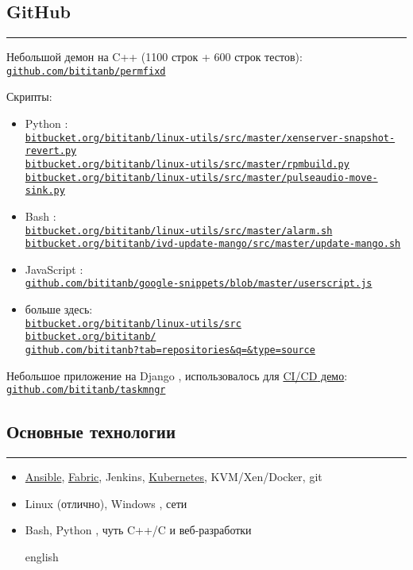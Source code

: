 \documentclass[11pt, a4paper]{article}
\newcommand{\Delimitline}{
  \vspace{-2ex}
  {\rule{\linewidth}{0.13ex}}
}
\newcommand\rurl[1]{%
  \href{http://#1}{\nolinkurl{#1}}%
}
\newcommand\Eng[1]{%
  \foreignlanguage{english}{#1}%
}
\begin{document}

\subsection*{{GitHub}}
\Delimitline

Небольшой демон на \Eng{C++} (1100 строк + 600 строк тестов):\\
  \rurl{github.com/bititanb/permfixd}
  
Скрипты:
\begin{itemize}
  \item \Eng{Python}:\\
    \rurl{bitbucket.org/bititanb/linux-utils/src/master/xenserver-snapshot-revert.py}\\
    \rurl{bitbucket.org/bititanb/linux-utils/src/master/rpmbuild.py}\\
    \rurl{bitbucket.org/bititanb/linux-utils/src/master/pulseaudio-move-sink.py}
  \item \Eng{Bash}:\\
    \rurl{bitbucket.org/bititanb/linux-utils/src/master/alarm.sh}\\
    \rurl{bitbucket.org/bititanb/ivd-update-mango/src/master/update-mango.sh}
  \item \Eng{JavaScript}:\\
    \rurl{github.com/bititanb/google-snippets/blob/master/userscript.js}
  \item больше здесь:\\
    \rurl{bitbucket.org/bititanb/linux-utils/src}\\
    \rurl{bitbucket.org/bititanb/}\\
    \rurl{github.com/bititanb?tab=repositories&q=&type=source}
\end{itemize}
Небольшое приложение на \Eng{Django}, использовалось для \href{https://github.com/bititanb/CI-CD-pipeline}{\Eng{CI/CD} демо}:\\
  \rurl{github.com/bititanb/taskmngr}

\subsection*{{Основные технологии}}
\Delimitline
\begin{itemize}
  \item \href{https://github.com/bititanb/ansible-taskmngr}{Ansible}, \href{https://bitbucket.org/bititanb/ivd-fabric/src}{Fabric}, Jenkins, \href{https://github.com/bititanb/ansible-taskmngr/tree/master/roles/taskmngr-kubernetes/templates}{Kubernetes}, KVM/Xen/Docker, git
  \item \Eng{Linux} (отлично), \Eng{Windows}, сети
  \item \Eng{Bash, Python}, чуть \Eng{C++/C} и веб-разработки
  \begin{otherlanguage*}{english}
  \end{otherlanguage*}
\end{itemize}
\end{document}
